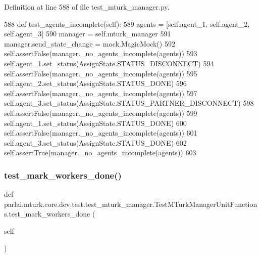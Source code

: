 Definition at line 588 of file test\+\_\+mturk\+\_\+manager.\+py.


\begin{DoxyCode}
588     \textcolor{keyword}{def }test\_agents\_incomplete(self):
589         agents = [self.agent\_1, self.agent\_2, self.agent\_3]
590         manager = self.mturk\_manager
591         manager.send\_state\_change = mock.MagicMock()
592         self.assertFalse(manager.\_no\_agents\_incomplete(agents))
593         self.agent\_1.set\_status(AssignState.STATUS\_DISCONNECT)
594         self.assertFalse(manager.\_no\_agents\_incomplete(agents))
595         self.agent\_2.set\_status(AssignState.STATUS\_DONE)
596         self.assertFalse(manager.\_no\_agents\_incomplete(agents))
597         self.agent\_3.set\_status(AssignState.STATUS\_PARTNER\_DISCONNECT)
598         self.assertFalse(manager.\_no\_agents\_incomplete(agents))
599         self.agent\_1.set\_status(AssignState.STATUS\_DONE)
600         self.assertFalse(manager.\_no\_agents\_incomplete(agents))
601         self.agent\_3.set\_status(AssignState.STATUS\_DONE)
602         self.assertTrue(manager.\_no\_agents\_incomplete(agents))
603 
\end{DoxyCode}
\mbox{\label{classparlai_1_1mturk_1_1core_1_1dev_1_1test_1_1test__mturk__manager_1_1TestMTurkManagerUnitFunctions_ad8cf3af0039dd5eea8fb280b3375c3c4}} 
\subsubsection{\texorpdfstring{test\+\_\+mark\+\_\+workers\+\_\+done()}{test\_mark\_workers\_done()}}
{\footnotesize\ttfamily def parlai.\+mturk.\+core.\+dev.\+test.\+test\+\_\+mturk\+\_\+manager.\+Test\+M\+Turk\+Manager\+Unit\+Functions.\+test\+\_\+mark\+\_\+workers\+\_\+done (\begin{DoxyParamCaption}\item[{}]{self }\end{DoxyParamCaption})}




